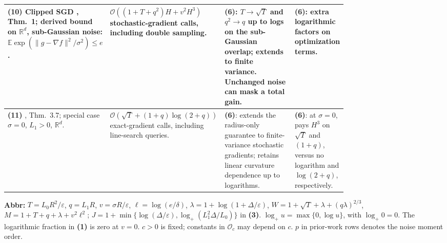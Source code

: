 \begin{table}[tp]
\begin{threeparttable}
\begin{tabularx}{\linewidth}{@{}>{\raggedright\arraybackslash}p{0.20\linewidth}>{\raggedright\arraybackslash}p{0.32\linewidth}>{\raggedright\arraybackslash}p{0.25\linewidth}>{\raggedright\arraybackslash}X@{}}
\midrule
\textbf{(10)} Clipped SGD \citep{sgacGaash2025v2}, Thm.~1; derived bound on $\mathbb R^d$, sub-Gaussian noise: $\mathbb E\exp(\|g-\nabla f\|^2/\sigma^2)\le e$.
& $\mathcal{O}\!\left((1+T+q^2)H+v^2H^3\right)$ stochastic-gradient calls, including double sampling.
& \textbf{(6)}: $T\to\sqrt T$ and $q^2\to q$ up to logs on the sub-Gaussian overlap; extends to finite variance. Unchanged noise can mask a total gain.
& \textbf{(6)}: extra logarithmic factors on optimization terms. \\
\midrule
\textbf{(11)} \citep{fvRadiusRudomanov2026v1}, Thm.~3.7; special case $\sigma=0$, $L_1>0$, $\mathbb R^d$.
& $\mathcal{O}\!\left(\sqrt T+(1+q)\log(2+q)\right)$ exact-gradient calls, including line-search queries.
& \textbf{(6)}: extends the radius-only guarantee to finite-variance stochastic gradients; retains linear curvature dependence up to logarithms.
& \textbf{(6)}: at $\sigma=0$, pays $H^3$ on $\sqrt T$ and $(1+q)$, versus no logarithm and $\log(2+q)$, respectively. \\
\bottomrule
\end{tabularx}
\begin{tablenotes}[flushleft]\footnotesize
\item[] \textbf{Abbr:} $T=L_0R^2/\varepsilon$, $q=L_1R$, $v=\sigma R/\varepsilon$, $\ell=\log(e/\delta)$, $\lambda=1+\log(1+\Delta/\varepsilon)$, $W=1+\sqrt T+\lambda+(q\lambda)^{2/3}$, $M=1+T+q+\lambda+v^2\ell^2$; $J=1+\min\{\log(\Delta/\varepsilon),\log_+(L_1^2\Delta/L_0)\}$ in \textbf{(3)}. $\log_+u=\max\{0,\log u\}$, with $\log_+0=0$. The logarithmic fraction in \textbf{(1)} is zero at $v=0$. $c>0$ is fixed; constants in $\mathcal{O}_c$ may depend on $c$. $p$ in prior-work rows denotes the noise moment order.
\end{tablenotes}
\end{threeparttable}
\end{table}
\clearpage
